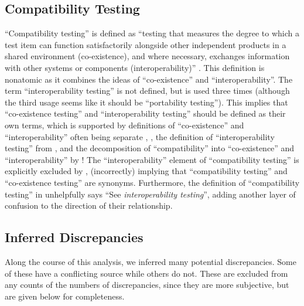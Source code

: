 \subsection{Compatibility Testing}
\label{compat-discrep}

``Compatibility testing'' is defined as ``testing that measures the
degree to which a test item can function satisfactorily alongside
other independent products in a shared environment (co-existence),
and where necessary, exchanges information with other systems or
components (interoperability)'' \citep[p.~3]{IEEE2022}. This
definition is nonatomic as it combines the ideas of ``co-existence''
and ``interoperability''. The term ``interoperability testing'' is
not defined, but is used three times \citep[pp.~22,~43]{IEEE2022}
(although the third usage seems like it should be ``portability
testing''). This implies that ``co-existence testing'' and
``interoperability testing'' should be defined as their own terms,
which is supported by definitions of ``co-existence'' and
``interoperability'' often being separate \ifnotpaper
    \citetext{\citealpISTQB{}; \citealp[pp.~73,~237]{IEEE2017}}%
\else
    \cite[pp.~73,~237]{IEEE2017}, \cite{ISTQB}%
\fi, the definition of
``interoperability testing'' from \citet[p.~238]{IEEE2017},
and the decomposition of ``compatibility'' into ``co-existence''
and ``interoperability'' by \citet{ISO_IEC2023a}!
The ``interoperability'' element of ``compatibility testing'' is explicitly
excluded by \citet[p.~37]{IEEE2021}, (incorrectly) implying that ``compatibility
testing'' and ``co-existence testing'' are synonyms.
Furthermore, the definition of ``compatibility testing'' in
\citep[p.~43]{Kam2008} unhelpfully says ``See \emph{interoperability testing}'',
adding another layer of confusion to the direction of their relationship.

\ifnotpaper
    \subsection{Inferred Discrepancies}
    \label{infer-discreps}
    Along the course of this analysis, we inferred many potential discrepancies.
    Some of these have a conflicting source while others do not. These are
    excluded from any counts of the numbers of discrepancies, since they are
    more subjective, but are given below for completeness.

